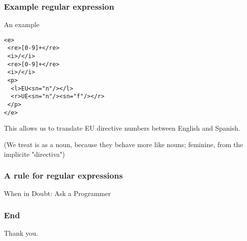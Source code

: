 \documentclass{beamer} %
\begin{document}
\begin{frame}
  \frametitle{Example regular expression}

  \begin{exampleblock}{An example}
    \begin{footnotesize}
    \begin{alltt}
      <e> \\
      ~<re>[0-9]+</re> \\
      ~<i>/</i> \\
      ~<re>[0-9]+</re> \\
      ~<i>/</i> \\
      ~<p> \\
      ~~<l>EU<s n="n"/></l> \\
      ~~<r>UE<s n="n"/><s n="f"/></r> \\
      ~</p> \\
      </e> \\
    \end{alltt}
    \end{footnotesize}
  \end{exampleblock}

  This allows us to translate EU directive numbers between English and Spanish.

  \pause

  (We treat is as a noun, because they behave more like nouns; feminine, from the implicite "directiva")
\end{frame}
\begin{frame}
\frametitle{A rule for regular expressions}

 \begin{center}
 {\Large When in Doubt: Ask a Programmer}
 \end{center}
\end{frame}

\begin{frame}
\frametitle{End}

 \begin{center}
 Thank you.
 \end{center}
\end{frame}
\end{document}
